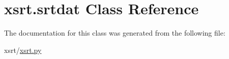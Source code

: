 \hypertarget{classxsrt_1_1srtdat}{}\section{xsrt.\+srtdat Class Reference}
\label{classxsrt_1_1srtdat}


The documentation for this class was generated from the following file\+:\begin{DoxyCompactItemize}
\item 
xsrt/\hyperlink{xsrt_8py}{xsrt.\+py}\end{DoxyCompactItemize}
